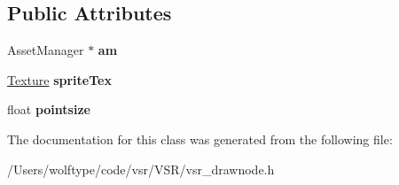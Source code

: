 \subsection*{Public Attributes}
\begin{DoxyCompactItemize}
\item 
\hypertarget{classvsr_1_1_sprite_node_a7f0e3d4a1b234dbcefe996e88148f50d}{Asset\-Manager $\ast$ {\bfseries am}}\label{classvsr_1_1_sprite_node_a7f0e3d4a1b234dbcefe996e88148f50d}

\item 
\hypertarget{classvsr_1_1_sprite_node_aa21127151e7b7f4b6c3d834386261ca3}{\hyperlink{classvsr_1_1_texture}{Texture} {\bfseries sprite\-Tex}}\label{classvsr_1_1_sprite_node_aa21127151e7b7f4b6c3d834386261ca3}

\item 
\hypertarget{classvsr_1_1_sprite_node_a3a1e219ce5b049da010edf2f823ba0f3}{float {\bfseries pointsize}}\label{classvsr_1_1_sprite_node_a3a1e219ce5b049da010edf2f823ba0f3}

\end{DoxyCompactItemize}


The documentation for this class was generated from the following file\-:\begin{DoxyCompactItemize}
\item 
/\-Users/wolftype/code/vsr/\-V\-S\-R/vsr\-\_\-drawnode.\-h\end{DoxyCompactItemize}
